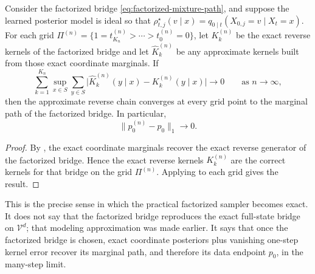 \documentclass[11pt]{article}
\begin{document}
\begin{corollary}
\label{cor:factorized-small-step-recovery}
Consider the factorized bridge \eqref{eq:factorized-mixture-path}, and suppose the learned posterior model is ideal so that \(\rho_{t,j}^\star(v\mid x)=q_{0\mid t}(X_{0,j}=v\mid X_t=x)\).
For each grid \(\Pi^{(n)}=\{1=t^{(n)}_{K_n}>\cdots>t^{(n)}_0=0\}\), let \(K_k^{(n)}\) be the exact reverse kernels of the factorized bridge and let \(\hat K_k^{(n)}\) be any approximate kernels built from those exact coordinate marginals.
If
\[
  \sum_{k=1}^{K_n}
  \sup_{x\in S}\sum_{y\in S}
  \bigl|\hat K_k^{(n)}(y\mid x)-K_k^{(n)}(y\mid x)\bigr|
  \longrightarrow 0
  \qquad\text{as } n\to\infty,
\]
then the approximate reverse chain converges at every grid point to the marginal path of the factorized bridge.
In particular,
\[
  \|\hat p_0^{(n)}-p_0\|_1\to 0.
\]
\end{corollary}
\begin{proof}
By , the exact coordinate marginals recover the exact reverse generator of the factorized bridge.
Hence the exact reverse kernels \(K_k^{(n)}\) are the correct kernels for that bridge on the grid \(\Pi^{(n)}\).
Applying  to each grid gives the result.%
\end{proof}

This is the precise sense in which the practical factorized sampler becomes exact.
It does not say that the factorized bridge reproduces the exact full-state bridge on \(\mathcal{V}^d\); that modeling approximation was made earlier.
It says that once the factorized bridge is chosen, exact coordinate posteriors plus vanishing one-step kernel error recover its marginal path, and therefore its data endpoint \(p_0\), in the many-step limit.
\end{document}
